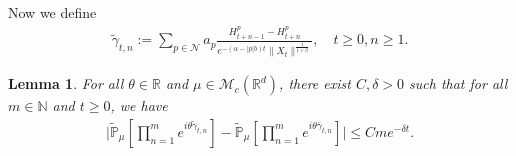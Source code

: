 \documentclass[12pt,a4paper]{amsart}
\theoremstyle{plain}
\newtheorem{lem}[thm]{Lemma}
\theoremstyle{definition}
\numberwithin{equation}{section}
\begin{document}
    Now we define
\begin{align}
    \widetilde{\gamma}_{t,n}
    :=\sum_{p\in \mathcal{N}}a_p\frac{H^p_{t+n-1}-H^p_{t+n}}{e^{-(\alpha-|p|b)t}\|X_{t}\|^{\frac{1}{1+\beta}}},
    \quad t\geq 0, n\geq 1.
\end{align}
\begin{lem}\label{lem: lemma04}
    For all $\theta\in \mathbb{R}$ and $\mu\in \mathcal{M}_c(\mathbb{R}^d)$, there exist $C,\delta>0$ such that for all $m\in \mathbb{N}$ and $t\geq 0$, we have
\begin{align}
    \Big|\widetilde{\mathbb{P}}_{\mu}[\prod_{n=1}^m e^{i\theta \widetilde{\gamma}_{t,n}}]-\widetilde{\mathbb{P}}_{\mu}[\prod_{n=1}^me^{i\theta \bar{\gamma}_{t,n}}]\Big|
    \leq C m e^{-\delta t}.
\end{align}
\end{lem}
\end{document}
